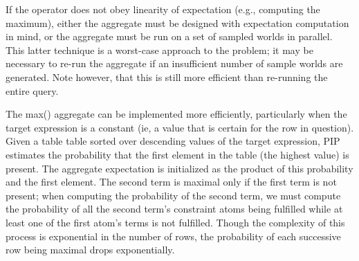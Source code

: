 If the operator does not obey linearity of expectation (e.g., computing the maximum), either the aggregate must be designed with expectation computation in mind, or the aggregate must be run on a set of sampled worlds in parallel.  This latter technique is a worst-case approach to the problem; it may be necessary to re-run the aggregate if an insufficient number of sample worlds are generated. Note however, that this is still more efficient than re-running the entire query.

The max() aggregate can be implemented more efficiently, particularly when the target expression is a constant (ie, a value that is certain for the row in question).  Given a table table sorted over descending values of the target expression, PIP estimates the probability that the first element in the table (the highest value) is present.  The aggregate expectation is initialized as the product of this probability and the first element.  The second term is maximal only if the first term is not present; when computing the probability of the second term, we must compute the probability of all the second term's constraint atoms being fulfilled while at least one of the first atom's terms is not fulfilled.  Though the complexity of this process is exponential in the number of rows, the probability of each successive row being maximal drops exponentially.  

